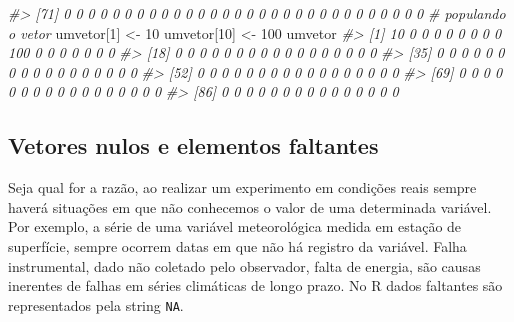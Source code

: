 \documentclass[]{book}
\newenvironment{Shaded}{\begin{snugshade}}{\end{snugshade}}
\newcommand{\DecValTok}[1]{\textcolor[rgb]{0.00,0.00,0.81}{#1}}
\newcommand{\StringTok}[1]{\textcolor[rgb]{0.31,0.60,0.02}{#1}}
\newcommand{\CommentTok}[1]{\textcolor[rgb]{0.56,0.35,0.01}{\textit{#1}}}
\newcommand{\NormalTok}[1]{#1}
\begin{document}
\begin{Shaded}
\begin{Highlighting}[]
\CommentTok{#>  [71] 0 0 0 0 0 0 0 0 0 0 0 0 0 0 0 0 0 0 0 0 0 0 0 0 0 0 0 0 0 0}
\CommentTok{# populando o vetor}
\NormalTok{umvetor[}\DecValTok{1}\NormalTok{] <-}\StringTok{ }\DecValTok{10}
\NormalTok{umvetor[}\DecValTok{10}\NormalTok{] <-}\StringTok{ }\DecValTok{100}
\NormalTok{umvetor}
\CommentTok{#>   [1]  10   0   0   0   0   0   0   0   0 100   0   0   0   0   0   0   0}
\CommentTok{#>  [18]   0   0   0   0   0   0   0   0   0   0   0   0   0   0   0   0   0}
\CommentTok{#>  [35]   0   0   0   0   0   0   0   0   0   0   0   0   0   0   0   0   0}
\CommentTok{#>  [52]   0   0   0   0   0   0   0   0   0   0   0   0   0   0   0   0   0}
\CommentTok{#>  [69]   0   0   0   0   0   0   0   0   0   0   0   0   0   0   0   0   0}
\CommentTok{#>  [86]   0   0   0   0   0   0   0   0   0   0   0   0   0   0   0}
\end{Highlighting}
\end{Shaded}

\subsection{Vetores nulos e elementos
faltantes}\label{vetores-nulos-e-elementos-faltantes}

Seja qual for a razão, ao realizar um experimento em condições reais
sempre haverá situações em que não conhecemos o valor de uma determinada
variável. Por exemplo, a série de uma variável meteorológica medida em
estação de superfície, sempre ocorrem datas em que não há registro da
variável. Falha instrumental, dado não coletado pelo observador, falta
de energia, são causas inerentes de falhas em séries climáticas de longo
prazo. No R dados faltantes são representados pela string \texttt{NA}.
\end{document}
